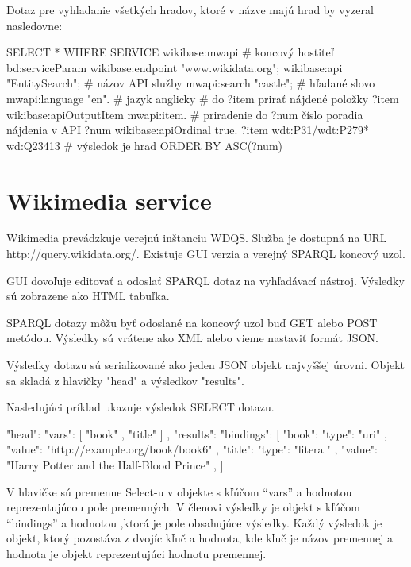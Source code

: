 Dotaz pre vyhľadanie všetkých hradov, ktoré v názve majú hrad by vyzeral nasledovne: 
\begin{code}
    SELECT * WHERE { 
    SERVICE wikibase:mwapi { 
    # koncový hostiteľ 
    bd:serviceParam wikibase:endpoint "www.wikidata.org"; 
    wikibase:api "EntitySearch"; # názov API služby 
    mwapi:search "castle"; # hľadané slovo 
    mwapi:language "en". # jazyk anglicky 
    # do ?item prirať nájdené položky 
    ?item wikibase:apiOutputItem mwapi:item. 
    # priradenie do ?num číslo poradia nájdenia v API 
    ?num wikibase:apiOrdinal true. 
    } 
    ?item wdt:P31/wdt:P279* wd:Q23413 # výsledok je hrad 
    } ORDER BY ASC(?num) 
\end{code}

\section{Wikimedia service}
Wikimedia prevádzkuje verejnú inštanciu WDQS. Služba je dostupná na URL http://query.wikidata.org/. 
Existuje GUI verzia a verejný SPARQL koncový uzol. 

GUI dovoľuje editovať a odoslať SPARQL dotaz na vyhľadávací nástroj. Výsledky sú zobrazene ako 
HTML tabuľka. 

SPARQL dotazy môžu byť odoslané na koncový uzol buď GET alebo POST metódou. Výsledky sú vrátene ako 
XML alebo vieme nastaviť formát JSON. 

Výsledky dotazu sú serializované ako jeden JSON objekt najvyššej úrovni. Objekt sa skladá 
z hlavičky "head" a výsledkov "results". 

Nasledujúci príklad ukazuje výsledok SELECT dotazu. 
\begin{code}
    {
    "head": { "vars": [ "book" , "title" ]
    } ,
    "results": {
    "bindings": [
    {
    "book": {
    "type": "uri" ,
    "value": "http://example.org/book/book6"
    } ,
    "title": {
    "type": "literal" ,
    "value": "Harry Potter and the Half-Blood Prince"
    }
    } ,
    ]
    }
    }
\end{code}
V hlavičke sú premenne Select-u v objekte 
s kľúčom “vars” a hodnotou reprezentujúcou pole premenných. V členovi výsledky je 
objekt s kľúčom “bindings” a hodnotou ,ktorá je pole obsahujúce výsledky. Každý výsledok je objekt, ktorý pozostáva 
z dvojíc kľuč a hodnota, kde kľuč je názov premennej a hodnota je objekt reprezentujúci hodnotu premennej. 